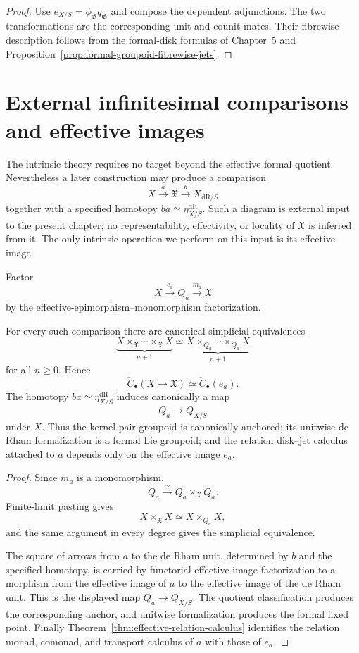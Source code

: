 \begin{proof}
Use $e_{X/S}=\bar\phi_{\mathfrak G}q_{\mathfrak G}$ and compose the dependent
adjunctions.  The two transformations are the corresponding unit and counit
mates.  Their fibrewise description follows from the formal-disk formulas of
Chapter~5 and Proposition~\ref{prop:formal-groupoid-fibrewise-jets}.
\end{proof}

\section{External infinitesimal comparisons and effective images}
\label{sec:flg-full-effective}

The intrinsic theory requires no target beyond the effective formal quotient.
Nevertheless a later construction may produce a comparison
\[
    X\xrightarrow{a}\mathfrak X\xrightarrow{b}X_{\mathrm{dR}/S}
\]
together with a specified homotopy
$ba\simeq\eta_{X/S}^{\mathrm{dR}}$.  Such a diagram is external input to the
present chapter; no representability, effectivity, or locality of
$\mathfrak X$ is inferred from it.  The only intrinsic operation we perform
on this input is its effective image.

Factor
\[
    X\xrightarrow{e_a}Q_a\xrightarrow{m_a}\mathfrak X
\]
by the effective-epimorphism--monomorphism factorization.

\begin{proposition}
\label{prop:kernel-pair-image-invariance}
For every such comparison there are canonical simplicial equivalences
\[
    \underbrace{
    X\times_{\mathfrak X}\cdots\times_{\mathfrak X}X
    }_{n+1}
    \simeq
    \underbrace{
    X\times_{Q_a}\cdots\times_{Q_a}X
    }_{n+1}
\]
for all $n\geq0$.  Hence
\[
    \check C_\bullet(X\to\mathfrak X)
    \simeq
    \check C_\bullet(e_a).
\]
The homotopy $ba\simeq\eta_{X/S}^{\mathrm{dR}}$ induces canonically a map
\[
    Q_a\longrightarrow Q_{X/S}
\]
under $X$.  Thus the kernel-pair groupoid is canonically anchored; its
unitwise de Rham formalization is a formal Lie groupoid; and the relation disk--jet
calculus attached to $a$ depends only on the effective image $e_a$.
\end{proposition}

\begin{proof}
Since $m_a$ is a monomorphism,
\[
    Q_a\xrightarrow{\simeq}Q_a\times_{\mathfrak X}Q_a.
\]
Finite-limit pasting gives
\[
    X\times_{\mathfrak X}X
    \simeq
    X\times_{Q_a}X,
\]
and the same argument in every degree gives the simplicial equivalence.

The square of arrows from $a$ to the de Rham unit, determined by $b$ and the
specified homotopy, is carried by functorial effective-image factorization to
a morphism from the effective image of $a$ to the effective image of the de
Rham unit.  This is the displayed map $Q_a\to Q_{X/S}$.  The quotient
classification produces the corresponding anchor, and unitwise formalization
produces the formal fixed point.  Finally
Theorem~\ref{thm:effective-relation-calculus} identifies the relation monad,
comonad, and transport calculus of $a$ with those of $e_a$.
\end{proof}

